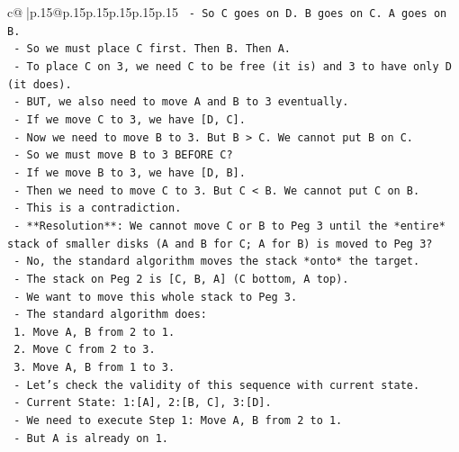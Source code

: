 \documentclass{article}
\begin{document}
{\begin{supertabular}{c@{$\;$}|p{.15\linewidth}@{}p{.15\linewidth}p{.15\linewidth}p{.15\linewidth}p{.15\linewidth}p{.15\linewidth}}
{{{\texttt{                 {-} So C goes on D. B goes on C. A goes on B.} \\
\texttt{                 {-} So we must place C first. Then B. Then A.} \\
\texttt{                 {-} To place C on 3, we need C to be free (it is) and 3 to have only D (it does).} \\
\texttt{                 {-} BUT, we also need to move A and B to 3 eventually.} \\
\texttt{                 {-} If we move C to 3, we have {[}D, C{]}.} \\
\texttt{                 {-} Now we need to move B to 3. But B > C. We cannot put B on C.} \\
\texttt{                 {-} So we must move B to 3 BEFORE C?} \\
\texttt{                 {-} If we move B to 3, we have {[}D, B{]}.} \\
\texttt{                 {-} Then we need to move C to 3. But C < B. We cannot put C on B.} \\
\texttt{                 {-} This is a contradiction.} \\
\texttt{                 {-} **Resolution**: We cannot move C or B to Peg 3 until the *entire* stack of smaller disks (A and B for C; A for B) is moved to Peg 3?} \\
\texttt{                 {-} No, the standard algorithm moves the stack *onto* the target.} \\
\texttt{                 {-} The stack on Peg 2 is {[}C, B, A{]} (C bottom, A top).} \\
\texttt{                 {-} We want to move this whole stack to Peg 3.} \\
\texttt{                 {-} The standard algorithm does:} \\
\texttt{                   1. Move A, B from 2 to 1.} \\
\texttt{                   2. Move C from 2 to 3.} \\
\texttt{                   3. Move A, B from 1 to 3.} \\
\texttt{                 {-} Let's check the validity of this sequence with current state.} \\
\texttt{                 {-} Current State: 1:{[}A{]}, 2:{[}B, C{]}, 3:{[}D{]}.} \\
\texttt{                 {-} We need to execute Step 1: Move A, B from 2 to 1.} \\
\texttt{                   {-} But A is already on 1.} \\
}}}
\end{supertabular}}
\end{document}
